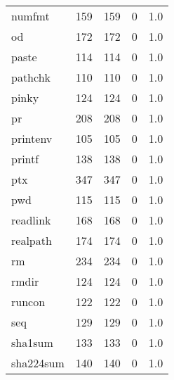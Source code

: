 \begin{tabular}{lrrrr}
numfmt    &                     159 &              159 &                 0 &                          1.0 \\
od        &                     172 &              172 &                 0 &                          1.0 \\
paste     &                     114 &              114 &                 0 &                          1.0 \\
pathchk   &                     110 &              110 &                 0 &                          1.0 \\
pinky     &                     124 &              124 &                 0 &                          1.0 \\
pr        &                     208 &              208 &                 0 &                          1.0 \\
printenv  &                     105 &              105 &                 0 &                          1.0 \\
printf    &                     138 &              138 &                 0 &                          1.0 \\
ptx       &                     347 &              347 &                 0 &                          1.0 \\
pwd       &                     115 &              115 &                 0 &                          1.0 \\
readlink  &                     168 &              168 &                 0 &                          1.0 \\
realpath  &                     174 &              174 &                 0 &                          1.0 \\
rm        &                     234 &              234 &                 0 &                          1.0 \\
rmdir     &                     124 &              124 &                 0 &                          1.0 \\
runcon    &                     122 &              122 &                 0 &                          1.0 \\
seq       &                     129 &              129 &                 0 &                          1.0 \\
sha1sum   &                     133 &              133 &                 0 &                          1.0 \\
sha224sum &                     140 &              140 &                 0 &                          1.0 \\

\end{tabular}
